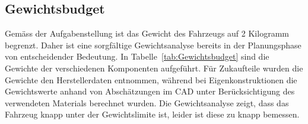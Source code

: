 \documentclass[main.tex]{subfiles} %
\begin{document}
\subsection{Gewichtsbudget}

Gemäss der Aufgabenstellung ist das Gewicht des Fahrzeugs auf 2 Kilogramm begrenzt. 
Daher ist eine sorgfältige Gewichtsanalyse bereits in der Planungsphase von entscheidender Bedeutung. 
In Tabelle~\ref{tab:Gewichtsbudget} sind die Gewichte der verschiedenen Komponenten aufgeführt. 
Für Zukaufteile wurden die Gewichte den Herstellerdaten entnommen, während bei Eigenkonstruktionen 
die Gewichtswerte anhand von Abschätzungen im CAD unter Berücksichtigung des verwendeten Materials berechnet wurden.
Die Gewichtsanalyse zeigt, dass das Fahrzeug knapp unter der Gewichtslimite ist, leider ist diese zu knapp bemessen.
\end{document}
